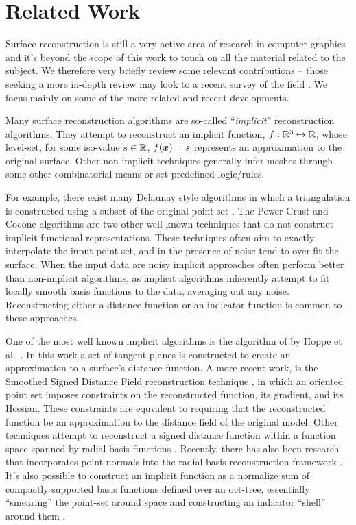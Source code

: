 \section{Related Work}
Surface reconstruction is still a very active area of research in computer graphics and it's beyond the scope of this work to touch on all the material related to the subject. We therefore very briefly review some relevant contributions -- those seeking a more in-depth review may look to a recent survey of the field \cite{reconstar_eg14}. We focus mainly on some of the more related and recent developments. 

Many surface reconstruction algorithms are so-called ``\emph{implicit}'' reconstruction algorithms. They attempt to 
reconstruct an implicit function, $f : \mathbb{R}^3 \mapsto \mathbb{R} $, whose level-set, for some iso-value $s \in \mathbb{R}$, $f(\boldsymbol{x})=s$ represents an approximation to the original surface. Other non-implicit techniques generally infer meshes through some other combinatorial means or set predefined logic/rules.

For example, there exist many Delaunay style algorithms in which a triangulation is constructed using a subset of the original point-set \cite{delaunay}. The Power Crust \cite{powercrust} and Cocone \cite{cocone} algorithms are two other well-known techniques that do not construct implicit functional representations. These techniques often aim to exactly interpolate the input point set, and in the presence of noise tend to over-fit the surface. When the input data are noisy implicit approaches often perform better than non-implicit algorithms, as implicit algorithms inherently attempt to fit locally smooth basis functions to the data, averaging out any noise. Reconstructing either a distance function or an indicator function is common to these approaches.

One of the most well known implicit algorithms is the algorithm of by Hoppe et al.~\cite{hoppecut}. In this work a set of
tangent planes is constructed to create an approximation to a surface's distance function. A more recent work, is the Smoothed
Signed Distance Field reconstruction technique \cite{ssdrecon}, in which an oriented point set imposes constraints on the reconstructed function, its gradient, and its Hessian. These constraints are equvalent to requiring that the reconstructed function be an approximation to the distance field of the original model. Other techniques attempt to reconstruct a signed distance function within a function space spanned by radial basis functions \cite{radial}. Recently, there has also been research that incorporates point normals into the radial basis reconstruction framework \cite{hermite}. It's also possible to construct an implicit function as a normalize sum of compactly supported basis functions defined over an oct-tree, essentially ``smearing'' the point-set around space and constructing an indicator ``shell'' around them \cite{Fuhrmann2014}.

